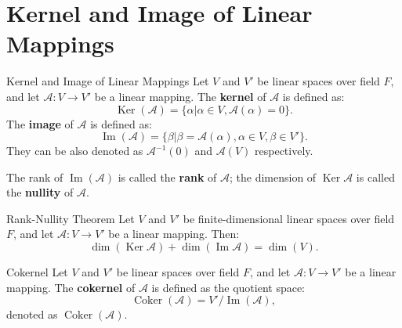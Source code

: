 \documentclass[11pt]{../../TexTemplate/elegantbook} %
\begin{document}
\section{Kernel and Image of Linear Mappings}
\begin{definition}{Kernel and Image of Linear Mappings}
    Let \( V \) and \( V' \) be linear spaces over field \( F \), 
    and let \( \mathcal{A}: V \to V' \) be a linear mapping. 
    The \textbf{kernel} of \( \mathcal{A} \) is defined as:
    \[
    \operatorname{Ker}(\mathcal{A}) = \{ \alpha | \alpha \in V, \mathcal{A}(\alpha) = 0 \}.
    \]
    The \textbf{image} of \( \mathcal{A} \) is defined as:
    \[
    \operatorname{Im}(\mathcal{A}) = \{ \beta | \beta = \mathcal{A}(\alpha), 
    \alpha \in V, \beta \in V' \}.
    \]
    They can be also denoted as \( \mathcal{A}^{-1}(0) \) and \( \mathcal{A}(V) \) respectively.

    The rank of \( \operatorname{Im}(\mathcal{A}) \) is called the \textbf{rank} of \( \mathcal{A} \);
    the dimension of \( \operatorname{Ker}\mathcal{A} \) is called the \textbf{nullity} of \( \mathcal{A} \).
\end{definition}

\begin{property}
    
\end{property}


\begin{theorem}{Rank-Nullity Theorem}
    Let \( V \) and \( V' \) be finite-dimensional linear spaces over field \( F \), 
    and let \( \mathcal{A}: V \to V' \) be a linear mapping. Then:
    \[
    \dim(\operatorname{Ker}\mathcal{A}) + \dim(\operatorname{Im}\mathcal{A}) = \dim(V).
    \]
\end{theorem}


\begin{definition}{Cokernel}
    Let \( V \) and \( V' \) be linear spaces over field \( F \), 
    and let \( \mathcal{A}: V \to V' \) be a linear mapping. 
    The \textbf{cokernel} of \( \mathcal{A} \) is defined as the quotient space:
    \[
    \operatorname{Coker}(\mathcal{A}) = V' / \operatorname{Im}(\mathcal{A}),
    \]
    denoted as \( \operatorname{Coker}(\mathcal{A}) \).
\end{definition}
\end{document}
